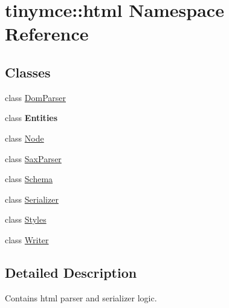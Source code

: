 \hypertarget{namespacetinymce_1_1html}{\section{tinymce\+:\+:html Namespace Reference}
\label{namespacetinymce_1_1html}
}
\subsection*{Classes}
\begin{DoxyCompactItemize}
\item 
class \hyperlink{classtinymce_1_1html_1_1_dom_parser}{Dom\+Parser}
\item 
class {\bfseries Entities}
\item 
class \hyperlink{classtinymce_1_1html_1_1_node}{Node}
\item 
class \hyperlink{classtinymce_1_1html_1_1_sax_parser}{Sax\+Parser}
\item 
class \hyperlink{classtinymce_1_1html_1_1_schema}{Schema}
\item 
class \hyperlink{classtinymce_1_1html_1_1_serializer}{Serializer}
\item 
class \hyperlink{classtinymce_1_1html_1_1_styles}{Styles}
\item 
class \hyperlink{classtinymce_1_1html_1_1_writer}{Writer}
\end{DoxyCompactItemize}


\subsection{Detailed Description}
Contains html parser and serializer logic. 